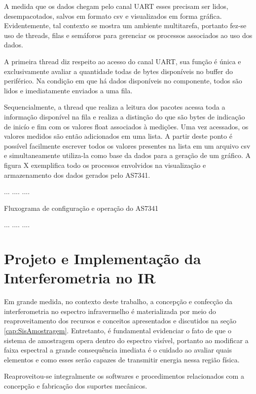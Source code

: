 \documentclass[oneside,openright,12pt]{ufsm_2021} %
\begin{document}
        \par A medida que os dados chegam pelo canal UART esses precisam ser lidos, desempacotados, salvos em formato csv e visualizados em forma gráfica. Evidentemente, tal contexto se mostra um ambiente multitarefa, portanto fez-se uso de threads, filas e semáforos para gerenciar os processos associados ao uso dos dados.

        \par A primeira thread diz respeito ao acesso do canal UART, sua função é única e exclusivamente avaliar a quantidade todas de bytes disponíveis no buffer do periférico. Na condição em que há dados disponíveis no componente, todos são lidos e imediatamente enviados a uma fila.

        \par Sequencialmente, a thread que realiza a leitura dos pacotes acessa toda a informação disponível na fila e realiza a distinção do que são bytes de indicação de inicío e fim com os valores float associados à medições. Uma vez acessados, os valores medidos são então adicionados em uma lista. A partir deste ponto é possível facilmente escrever todos os valores presentes na lista em um arquivo csv e simultaneamente utiliza-la como base da dados para a geração de um gráfico. A figura X exemplifica todo os processos envolvidos na visualização e armazenamento dos dados gerados pelo AS7341.

        \par ...    ....    ....
        \par Fluxograma de configuração e operação do AS7341
        \par ...    ....    ....   
        
        
\chapter{Projeto e Implementação da Interferometria no IR}
\label{cap:SisIR}
    \par Em grande medida, no contexto deste trabalho, a concepção e confecção da interferometria no espectro infravermelho é materializada por meio do reaproveitamento dos recursos e conceitos apresentados e discutidos na seção \ref{cap:SisAmostragem}. Entretanto, é fundamental evidenciar o fato de que o sistema de amostragem opera dentro do espectro visível, portanto ao modificar a faixa espectral a grande consequência imediata é o cuidado ao avaliar quais elementos e como esses serão capazes de transmitir energia nessa região física.
    \par Reaproveitou-se integralmente os softwares e procedimentos relacionados com a concepção e fabricação dos suportes mecânicos.
\end{document}

